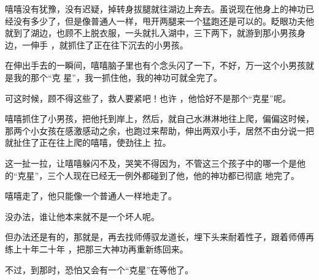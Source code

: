 \documentclass{article}
\begin{document}
嘻嘻没有犹豫，没有迟疑，掉转身拔腿就往湖边上奔去。虽说现在他身上的神功已经没有多少了，但是像普通人一样，甩开两腿来一个猛跑还是可以的。眨眼功夫他就到了湖边，也顾不上脱衣服，一头就扎入湖中，三下两下，就游到那小男孩身边，一伸手
，就抓住了正在往下沉去的小男孩。 

在伸出手去的一瞬间，嘻嘻脑子里也有个念头闪了一下，不好，万一这个小男孩就是我的那个“克
星”，我一抓住他，我的神功可就全完了。 

可这时候，顾不得这些了，救人要紧吧！也许
，他恰好不是那个“克星”呢。 

\newpage

嘻嘻抓住了小男孩，把他托到岸上，然后，就自己水淋淋地往上爬，偏偏这时候，那两个小女孩在感激感动之余，也跑过来帮助，伸出两双小手，居然不由分说一把就扯住了正在往上爬的嘻嘻，使劲往上
拉。 

这一扯一拉，让嘻嘻躲闪不及，哭笑不得因为，不管这三个孩子中的哪一个是他的“克星”，三个人现在已经无一例外都碰到了他，他的神功都已彻底
地完了。 

嘻嘻走了，他只能像一个普通人一样地走了。


没办法，谁让他本来就不是一个坏人呢。 

但办法还是有的，那就是，再去找师傅驭龙道长，埋下头来耐着性子，跟着师傅再练上十年二十年
，把那三大神功再重新练回来。 

不过，到那时，恐怕又会有一个“克星”在等他了。
\newpage
\end{document}
